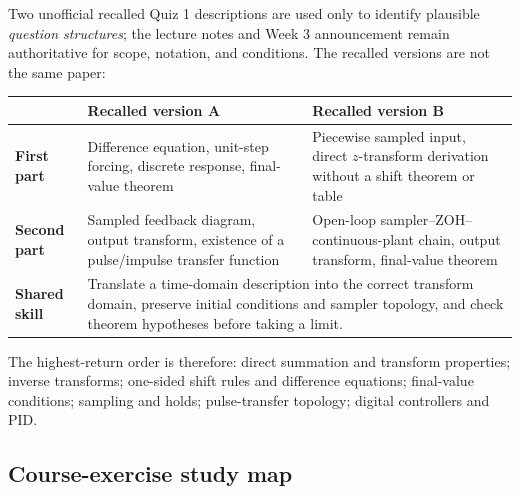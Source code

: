 \documentclass[11pt]{article}
\begin{document}
Two unofficial recalled Quiz 1 descriptions are used only to identify plausible \emph{question structures}; the lecture notes and Week 3 announcement remain authoritative for scope, notation, and conditions. The recalled versions are not the same paper:
\begin{center}
\begin{tabular}{>{\bfseries}p{}p{}p{}}
\toprule
 & Recalled version A & Recalled version B\\
\midrule
First part & Difference equation, unit-step forcing, discrete response, final-value theorem & Piecewise sampled input, direct $z$-transform derivation without a shift theorem or table\\
Second part & Sampled feedback diagram, output transform, existence of a pulse/impulse transfer function & Open-loop sampler--ZOH--continuous-plant chain, output transform, final-value theorem\\
Shared skill & \multicolumn{2}{p{0.70\textwidth}}{Translate a time-domain description into the correct transform domain, preserve initial conditions and sampler topology, and check theorem hypotheses before taking a limit.}\\
\bottomrule
\end{tabular}
\end{center}

The highest-return order is therefore: direct summation and transform properties; inverse transforms; one-sided shift rules and difference equations; final-value conditions; sampling and holds; pulse-transfer topology; digital controllers and PID.

\subsection{Course-exercise study map}
\end{document}
